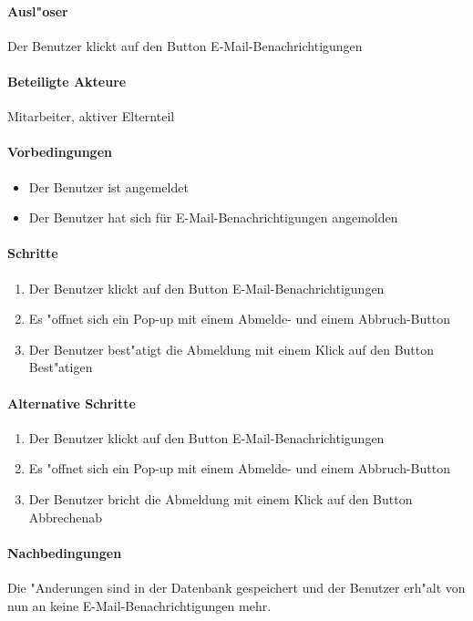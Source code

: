 	\paragraph{Ausl"oser}
	Der Benutzer klickt auf den Button \dq E-Mail-Benachrichtigungen\dq
	\paragraph{Beteiligte Akteure}   \leavevmode \newline
	Mitarbeiter, aktiver Elternteil
	\paragraph{Vorbedingungen}
	\begin{itemize}
		\item Der Benutzer ist angemeldet
		\item Der Benutzer hat sich für E-Mail-Benachrichtigungen angemolden
	\end{itemize}
	
	\paragraph{Schritte}
	\begin{enumerate}
		\item Der Benutzer klickt auf den Button \dq E-Mail-Benachrichtigungen\dq
		\item Es "offnet sich ein Pop-up mit einem Abmelde- und einem Abbruch-Button
		\item Der Benutzer best"atigt die Abmeldung mit einem Klick auf den Button \dq Best"atigen\dq
	\end{enumerate}
	
	\paragraph{Alternative Schritte}
	\begin{enumerate}
		\item Der Benutzer klickt auf den Button \dq E-Mail-Benachrichtigungen\dq
		\item Es "offnet sich ein Pop-up mit einem Abmelde- und einem Abbruch-Button
		\item Der Benutzer bricht die Abmeldung mit einem Klick auf den Button \dq Abbrechen\dq ab
	\end{enumerate}
	\paragraph{Nachbedingungen}
	Die "Anderungen sind in der Datenbank gespeichert und der Benutzer erh"alt von nun an keine E-Mail-Benachrichtigungen mehr. 
  

